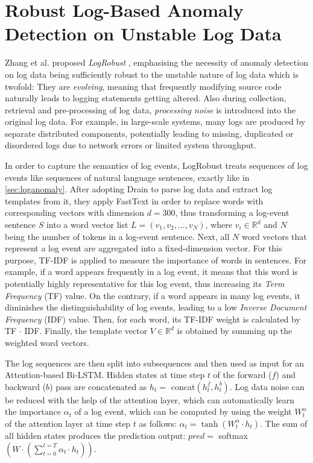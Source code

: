 \section{Robust Log-Based Anomaly Detection on Unstable Log Data\label{sec:logrobust}}
Zhang et al. proposed \textit{LogRobust} \cite{zhang2019robust}, emphasising the necessity of anomaly detection on log data being sufficiently robust to the unstable nature of log data which is twofold: They are \textit{evolving}, meaning that frequently modifying source code naturally leads to logging statements getting altered. Also during collection, retrieval and pre-processing of log data, \textit{processing noise} is introduced into the original log data. For example, in large-scale systems, many logs are produced by separate distributed components, potentially leading to missing, duplicated or disordered logs due to network errors or limited system throughput.

In order to capture the semantics of log events, LogRobust treats sequences of log events like sequences of natural language sentences, exactly like in \ref{sec:loganomaly}. After adopting Drain to parse log data and extract log templates from it, they apply FastText \cite{joulin2016fasttext} in order to replace words with corresponding vectors with dimension $d=300$, thus transforming a log-event sentence $S$ into a word vector list $L = (v_1,v_2,...,v_N)$, where $v_i \in \mathbb{R}^d$ and $N$ being the number of tokens in a log-event sentence. Next, all $N$ word vectors that represent a log event are aggregated into a fixed-dimension vector. For this purpose, TF-IDF is applied to measure the importance of words in sentences. For example, if a word appears frequently in a log event, it means that this word is potentially highly representative for this log event, thus increasing its \textit{Term Frequency} (TF) value. On the contrary, if a word appears in many log events, it diminishes the distinguishability of log events, leading to a low \textit{Inverse Document Frequency} (IDF) value. Then, for each word, its TF-IDF weight is calculated by TF $\cdot$ IDF. Finally, the template vector $V \in \mathbb{R}^d$ is obtained by summing up the weighted word vectors.

The log sequences are then split into subsequences and then used as input for an Attention-based Bi-LSTM. Hidden states at time step $t$ of the forward ($f$) and backward ($b$) pass are concatenated as $h_t =$ concat$(h_t^f, h_t^b)$. Log data noise can be reduced with the help of the attention layer, which can automatically learn the importance $\alpha_t$ of a log event, which can be computed by using the weight $W_t^\alpha$ of the attention layer at time step $t$ as follows: $\alpha_t = \tanh(W^\alpha_t \cdot h_t)$. The sum of all hidden states produces the prediction output: $pred = $ softmax $(W \cdot (\sum_{t=0}^{t=T} \alpha_t \cdot h_t))$.

